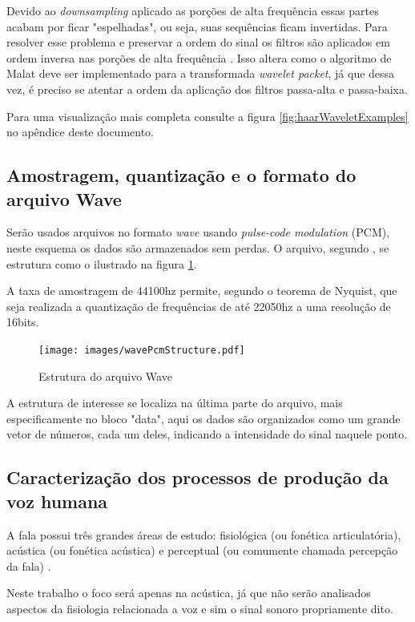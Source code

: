 \begin{myenv}{1.5}
				\par Devido ao \textit{downsampling} aplicado as porções de alta frequência essas partes acabam por ficar "espelhadas", ou seja, suas sequências ficam invertidas. Para resolver  esse problema e preservar a ordem do sinal os filtros são aplicados em ordem inversa nas porções de alta frequência \cite{Jensen_2001}. Isso altera como o algoritmo de Malat deve ser implementado para a transformada \textit{wavelet packet}, já que dessa vez, é preciso se atentar a ordem da aplicação dos filtros passa-alta e passa-baixa.

				
				
				\par Para uma visualização mais completa consulte a figura \ref{fig:haarWaveletExamples} no apêndice deste documento.
			\subsection{Amostragem, quantização e o formato do arquivo Wave}
				\par Serão usados arquivos no formato \textit{wave} usando \textit{pulse-code modulation} (PCM), neste esquema os dados são armazenados sem perdas. O arquivo, segundo \cite{WAVE2019}, se estrutura como o ilustrado na figura \ref{fig:wavePcmStructure}.
				
				\par A taxa de amostragem de 44100hz permite, segundo o teorema de Nyquist, que seja realizada a quantização de frequências de até 22050hz a uma resolução de 16bits.
			
				\begin{figure}[h]
					\centering
					\texttt{[image: images/wavePcmStructure.pdf]}
					\caption{Estrutura do arquivo Wave}
					\label{fig:wavePcmStructure}
				\end{figure}
				
				\par A estrutura de interesse se localiza na última parte do arquivo, mais especificamente no bloco "data", aqui os dados são organizados como um grande vetor de números, cada um deles, indicando a intensidade do sinal naquele ponto.
			\subsection{Caracterização dos processos de produção da voz humana}
				\par A fala possui três grandes áreas de estudo: fisiológica (ou fonética articulatória),  acústica  (ou fonética acústica)  e  perceptual  (ou  comumente  chamada percepção  da  fala) \cite{kremer2014eficiencia}.
				\par Neste trabalho o foco será apenas na acústica, já que não serão analisados aspectos da fisiologia relacionada a voz e sim o sinal sonoro propriamente dito.
				

\end{myenv}
